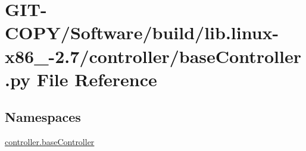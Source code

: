 \hypertarget{GIT-COPY_2Software_2build_2lib_8linux-x86__64-2_87_2controller_2baseController_8py}{}\section{G\+I\+T-\/\+C\+O\+P\+Y/\+Software/build/lib.linux-\/x86\+\_-\/2.7/controller/base\+Controller.py File Reference}
\label{GIT-COPY_2Software_2build_2lib_8linux-x86__64-2_87_2controller_2baseController_8py}
\subsection*{Namespaces}
\begin{DoxyCompactItemize}
\item 
 \hyperlink{namespacecontroller_1_1baseController}{controller.\+base\+Controller}
\end{DoxyCompactItemize}
